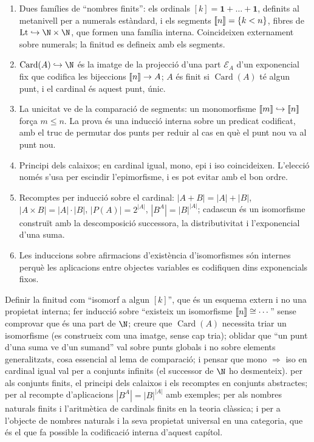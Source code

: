 \begin{resumcap}
\begin{enumerate}
  \item Dues famílies de \enquote{nombres finits}: els ordinals \([k]=\mathbf1+\dots+\mathbf1\), definits al metanivell per a numerals estàndard, i els segments \(\llbracket n\rrbracket=\{k<n\}\), fibres de \(\operatorname{Lt}\hookrightarrow\N\times\N\), que formen una família interna. Coincideixen externament sobre numerals; la finitud es defineix amb els segments.
  \item \(\operatorname{Card}(A)\hookrightarrow\N\) és la imatge de la projecció d'una part \(\mathcal E_A\) d'un exponencial fix que codifica les bijeccions \(\llbracket n\rrbracket\to A\); \(A\) és finit si \(\operatorname{Card}(A)\) té algun punt, i el cardinal és aquest punt, únic.
  \item La unicitat ve de la comparació de segments: un monomorfisme \(\llbracket m\rrbracket\hookrightarrow\llbracket n\rrbracket\) força \(m\le n\). La prova és una inducció interna sobre un predicat codificat, amb el truc de permutar dos punts per reduir al cas en què el punt nou va al punt nou.
  \item Principi dels calaixos; en cardinal igual, mono, epi i iso coincideixen. L'elecció només s'usa per escindir l'epimorfisme, i es pot evitar amb el bon ordre.
  \item Recomptes per inducció sobre el cardinal: \(|A+B|=|A|+|B|\), \(|A\times B|=|A|\cdot|B|\), \(|P(A)|=2^{|A|}\), \(|B^A|=|B|^{|A|}\); cadascun és un isomorfisme construït amb la descomposició successora, la distributivitat i l'exponencial d'una suma.
  \item Les induccions sobre afirmacions d'existència d'isomorfismes són internes perquè les aplicacions entre objectes variables es codifiquen dins exponencials fixos.
\end{enumerate}
 Definir la finitud com \enquote{isomorf a algun \([k]\)}, que és un esquema extern i no una propietat interna; fer inducció sobre \enquote{existeix un isomorfisme \(\llbracket n\rrbracket\cong\cdots\)} sense comprovar que és una part de \(\N\); creure que \(\operatorname{Card}(A)\) necessita triar un isomorfisme (es construeix com una imatge, sense cap tria); oblidar que \enquote{un punt d'una suma ve d'un sumand} val sobre punts globals i no sobre elements generalitzats, cosa essencial al lema de comparació; i pensar que mono \(\Rightarrow\) iso en cardinal igual val per a conjunts infinits (el successor de \(\N\) ho desmenteix).
 \cite[§§7.6--7.7 i cap.~8]{lawvere-rosebrugh} per als conjunts finits, el principi dels calaixos i els recomptes en conjunts abstractes; \cite[article~V, sessió~30]{lawvere-schanuel} per al recompte d'aplicacions \(|B^A|=|B|^{|A|}\) amb exemples; \cite[§§12--13]{halmos} per als nombres naturals finits i l'aritmètica de cardinals finits en la teoria clàssica; i \cite[§§7.1--7.2]{awodey} per a l'objecte de nombres naturals i la seva propietat universal en una categoria, que és el que fa possible la codificació interna d'aquest capítol.
\end{resumcap}
